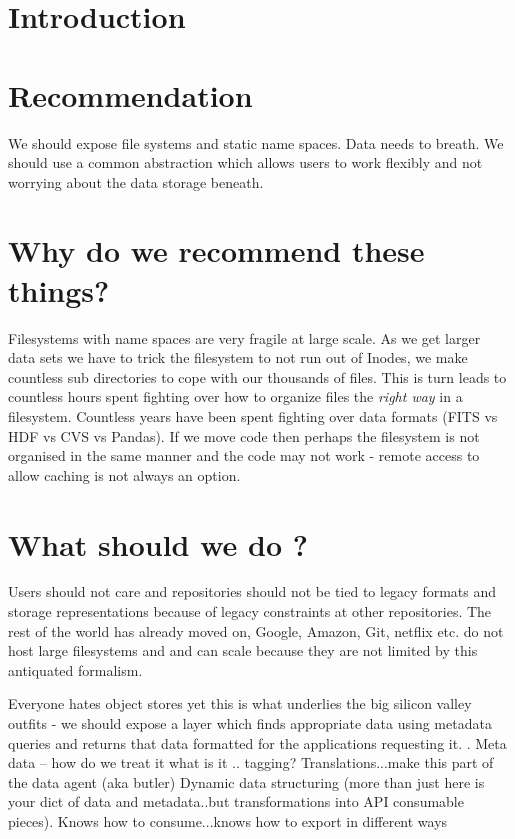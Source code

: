 \section{Introduction} \label{sec:intro}

\section{Recommendation }
We should  expose file systems and static name spaces.  Data needs to breath. We should use a common abstraction which allows users to work flexibly and not worrying about the data storage beneath.

\section{Why do we recommend these things?}
Filesystems with name spaces are very fragile at large scale. As we get larger data sets we have to trick the filesystem to not run out of Inodes, we make countless sub directories to cope with our thousands of files.
This is turn leads to countless hours spent fighting over how to organize files  the \emph{right way} in a filesystem.
Countless years have been spent fighting over data formats (FITS vs HDF vs CVS vs Pandas).
If we move code then perhaps the filesystem is not organised in the same manner and the code may not work - remote access to allow caching is not always an option.


\section{What should  we do ?}
Users should not care and repositories should not be tied to legacy formats  and storage representations because of legacy constraints  at other repositories.
The rest of the world has already moved on,  Google, Amazon, Git, netflix etc. do not host large filesystems and and can scale because they are not limited by this antiquated formalism.

Everyone hates object stores  yet this is what underlies the big silicon valley outfits - we should expose a layer which finds appropriate data using metadata queries and returns that data formatted for the applications requesting it.
.
Meta data -- how do we treat it what is it ..  tagging?  Translations...make this part of the data agent (aka butler)
Dynamic data structuring (more than just here is your dict of data and metadata..but transformations into API consumable pieces).  Knows how to consume...knows how to export in different ways

